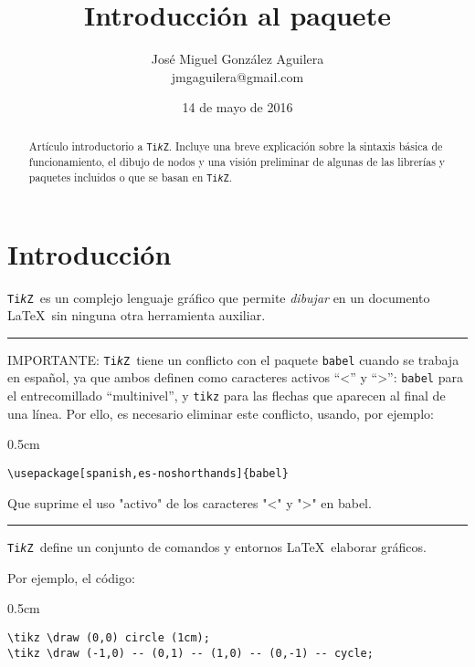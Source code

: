 \documentclass[a4paper,10pt]{article}
\title{Introducción al paquete {\tt \ttikz\protect}}
\author{José Miguel González Aguilera \\ jmgaguilera@gmail.com}
\date{14 de mayo de 2016}
\newcommand{\ttikz}{{\tt Ti\emph{k}Z}}
\newcommand{\mi}[1]{\texttt{#1}} %
\newenvironment{marcod}{\begin{adjustwidth}{0.5cm}{}}{\end{adjustwidth}}
\begin{document}
    \setmainfont{Lato}

\maketitle

\begin{abstract}
Artículo introductorio a \ttikz. Incluye una breve explicación sobre la sintaxis básica de funcionamiento, el dibujo de nodos y una visión preliminar de algunas de las librerías y paquetes incluidos o que se basan en \ttikz. 
\end{abstract}

\bigskip


\section{Introducción}

\ttikz\ es un complejo lenguaje gráfico que permite \emph{dibujar} en un documento \LaTeX\ sin ninguna otra herramienta auxiliar.

\bigskip

\hrule

\bigskip

\noindent IMPORTANTE: \ttikz\ tiene un conflicto con el paquete \mi{babel} cuando se trabaja en español, ya que ambos definen como caracteres activos “<” y “>”: \mi{babel} para el entrecomillado “multinivel”, y \mi{tikz} para las flechas que aparecen al final de una línea. Por ello, es necesario eliminar este conflicto, usando, por ejemplo:


\begin{marcod}
    \begin{verbatim}
\usepackage[spanish,es-noshorthands]{babel}
\end{verbatim}
\end{marcod}

\noindent Que suprime el uso "activo" de los caracteres "<" y ">" en babel.

\bigskip

\hrule

\bigskip

\ttikz\ define un conjunto de comandos y entornos \LaTeX\ elaborar gráficos.

Por ejemplo, el código:

\bigskip

\begin{marcod}
\begin{verbatim}
\tikz \draw (0,0) circle (1cm);    
\tikz \draw (-1,0) -- (0,1) -- (1,0) -- (0,-1) -- cycle;    
\end{verbatim}
\end{marcod}
\end{document}
